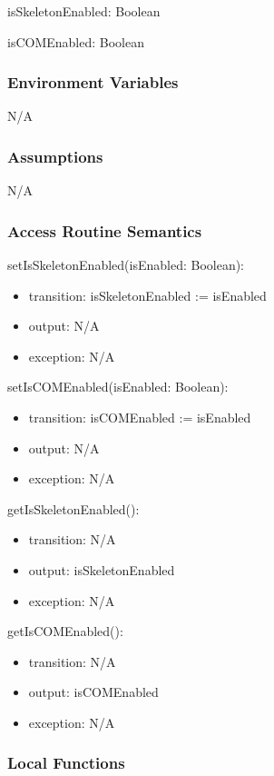 \documentclass[12pt, titlepage]{article}
\begin{document}
\noindent isSkeletonEnabled: Boolean

\noindent isCOMEnabled: Boolean

\subsubsection{Environment Variables}

N/A

\subsubsection{Assumptions}

N/A

\subsubsection{Access Routine Semantics}

\noindent setIsSkeletonEnabled(isEnabled: Boolean):
\begin{itemize}
\item transition: isSkeletonEnabled := isEnabled
\item output: N/A
\item exception: N/A
\end{itemize}

\noindent setIsCOMEnabled(isEnabled: Boolean):
\begin{itemize}
\item transition: isCOMEnabled := isEnabled
\item output: N/A
\item exception: N/A
\end{itemize}

\noindent getIsSkeletonEnabled():
\begin{itemize}
\item transition: N/A
\item output: isSkeletonEnabled
\item exception: N/A
\end{itemize}

\noindent getIsCOMEnabled():
\begin{itemize}
\item transition: N/A
\item output: isCOMEnabled
\item exception: N/A
\end{itemize}


\subsubsection{Local Functions}
\end{document}
